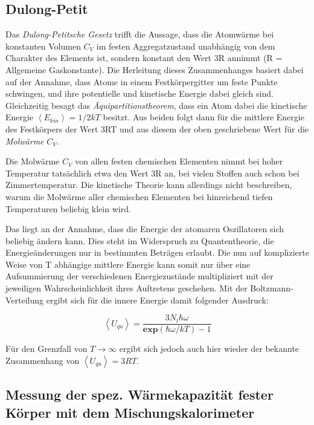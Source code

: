 \subsection{Dulong-Petit}

Das \emph{Dulong-Petitsche Gesetz} trifft die Aussage, dass die Atomwärme bei konstanten
Volumen $C_V$ im festen Aggregatzustand unabhängig von dem Charakter des Elements
ist, sondern konstant den Wert 3R annimmt (R = Allgemeine Gaskonstante). Die
Herleitung dieses Zusammenhanges basiert dabei auf der Annahme, dass Atome in
einem Festkörpergitter um feste Punkte schwingen, und ihre potentielle und
kinetische Energie dabei gleich sind. Gleichzeitig besagt das
\emph{Äquipartitionstheorem}, dass ein Atom dabei die kinetische Energie
$ \left< E_{kin} \right> = 1/2 k T$ besitzt. Aus beiden folgt dann für die mittlere Energie
des Festkörpers der Wert 3RT und aus diesem der oben geschriebene Wert für die
\emph{Molwärme} $C_V$.

Die Molwärme $C_V$ von allen festen chemischen Elementen nimmt bei hoher
Temperatur tatsächlich etwa den Wert 3R an, bei vielen Stoffen auch schon bei
Zimmertemperatur. Die kinetische Theorie kann allerdings nicht beschreiben, warum
die Molwärme aller chemischen Elementen bei hinreichend tiefen Temperaturen
beliebig klein wird.

Das liegt an der Annahme, dass die Energie der atomaren Oszillatoren sich
beliebig ändern kann. Dies steht im Widerspruch zu Quantentheorie, die
Energieänderungen nur in bestimmten Beträgen erlaubt. Die nun auf
komplizierte Weise von T abhängige mittlere Energie kann somit nur über
eine Aufsummierung der verschiedenen Energiezustände multipliziert mit der
jeweiligen Wahrscheinlichkeit ihres Auftretens geschehen. Mit der
Boltzmann-Verteilung ergibt sich für die innere Energie damit folgender Ausdruck:

\begin{equation}
  \left< U_{qu} \right> = \frac{ 3 N_l \hbar \omega}{\textbf{exp} (\hbar \omega / kT) - 1}
\end{equation}

Für den Grenzfall von $ T \to \infty$ ergibt sich jedoch auch hier wieder der
bekannte Zusammenhang von $\left< U_{qu} \right> = 3RT$.

\subsection{Messung der spez. Wärmekapazität fester Körper mit dem Mischungskalorimeter}

